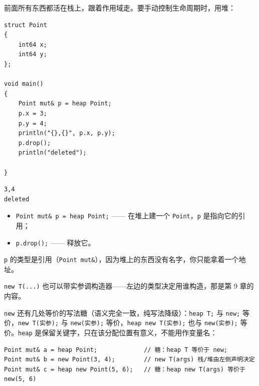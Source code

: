 前面所有东西都活在栈上，跟着作用域走。要手动控制生命周期时，用堆：

\par
\medskip
\begin{lstlisting}[style=chali]
struct Point
{
    int64 x;
    int64 y;
};

void main()
{
    Point mut& p = heap Point;
    p.x = 3;
    p.y = 4;
    println("{},{}", p.x, p.y);
    p.drop();
    println("deleted");

}
\end{lstlisting}
\par
\medskip

\par
\medskip
\begin{lstlisting}[style=out]
3,4
deleted
\end{lstlisting}
\par
\medskip

\begin{itemize}

\item \texttt{Point mut\& p =\allowbreak{} heap Point;} —— 在堆上建一个 \texttt{Point}，\texttt{p} 是指向它的引用；

\item \texttt{p.\allowbreak{}drop(\allowbreak{})\allowbreak{};} —— 释放它。

\end{itemize}

\texttt{p} 的类型是引用（\texttt{Point mut\&}），因为堆上的东西没有名字，你只能拿着一个地址。

\texttt{new T(\allowbreak{}.\allowbreak{}.\allowbreak{}.\allowbreak{})\allowbreak{}} 也可以带实参调构造器——左边的类型决定用谁构造，那是第 9 章的内容。

\texttt{new} 还有几处等价的写法糖（语义完全一致，纯写法降级）：\texttt{heap T;} 与 \texttt{new;} 等价，\texttt{new T(\allowbreak{}实参)\allowbreak{};} 与 \texttt{new(\allowbreak{}实参)\allowbreak{};} 等价，\texttt{heap new T(\allowbreak{}实参)\allowbreak{};} 也与 \texttt{new(\allowbreak{}实参)\allowbreak{};} 等价。\texttt{heap} 是保留关键字，只在该分配位置有意义，不能用作变量名：

\par
\medskip
\begin{lstlisting}[style=chali]
Point mut& a = heap Point;             // 糖：heap T 等价于 new;
Point mut& b = new Point(3, 4);        // new T(args) 栈/堆由左侧声明决定
Point mut& c = heap new Point(5, 6);   // 糖：heap new T(args) 等价于 new(5, 6)
\end{lstlisting}
\par
\medskip

